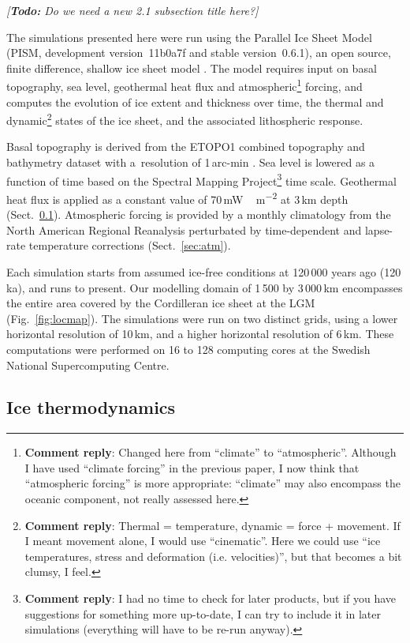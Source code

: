 \documentclass[tc, manuscript]{copernicus}
\newcommand{\renote}[1]{\footnote{\textbf{Comment reply}: #1}}
\newcommand{\todo}[1]{\emph{[\textbf{Todo:} #1]}}
\begin{document}
\noindent\todo{Do we need a new 2.1 subsection title here?}

The simulations presented here were run using the Parallel Ice Sheet Model
(PISM, development version~11b0a7f and stable version~0.6.1), an open source,
finite difference, shallow ice sheet model \citep{PISM-authors.2014}. The model
requires input on basal topography, sea level, geothermal heat flux and
atmospheric\renote{
    Changed here from ``climate'' to ``atmospheric''. Although I have used
    ``climate forcing'' in the previous paper, I now think that ``atmospheric
    forcing'' is more appropriate: ``climate'' may also encompass the oceanic
    component, not really assessed here.}
forcing, and computes the evolution of ice extent
and thickness over time, the thermal and dynamic\renote{
    Thermal = temperature, dynamic = force + movement. If I meant movement
    alone, I would use ``cinematic''. Here we could use ``ice temperatures,
    stress and deformation (i.e. velocities)'', but that becomes a bit clumsy,
    I feel.}
states of the ice sheet, and the associated lithospheric response.

Basal topography is derived from the ETOPO1 combined topography and bathymetry
dataset with a~resolution of 1\,arc-min \citep{Amante.Eakins.2009}. Sea level
is lowered as a function of time based on the Spectral Mapping Project\renote{
    I had no time to check for later products, but if you have suggestions for
    something more up-to-date, I can try to include it in later simulations
    (everything will have to be re-run anyway).}
\citep[SPECMAP;][]{Imbrie.etal.1989} time scale. Geothermal heat flux
is applied as a constant value of 70\,\unit{mW\,m^{-2}} at 3\,km depth
(Sect.~\ref{sec:icedyn}). Atmospheric forcing is provided by a monthly
climatology from the North American Regional Reanalysis
\citep[NARR;][]{Mesinger.etal.2006} perturbated by time-dependent and
lapse-rate temperature corrections (Sect.~\ref{sec:atm}).

Each simulation starts from assumed ice-free conditions at 120\,000 years ago
(120\,ka), and runs to present. Our modelling domain of 1\,500 by 3\,000\,km
encompasses the entire area covered by the Cordilleran ice sheet at the LGM
(Fig.~\ref{fig:locmap}). The simulations were run on two distinct grids, using
a lower horizontal resolution of 10\,km, and a higher horizontal resolution of
6\,km. These computations were performed on 16 to 128 computing cores at the
Swedish National Supercomputing Centre.

\subsection{Ice thermodynamics}
\label{sec:icedyn}
\end{document}
